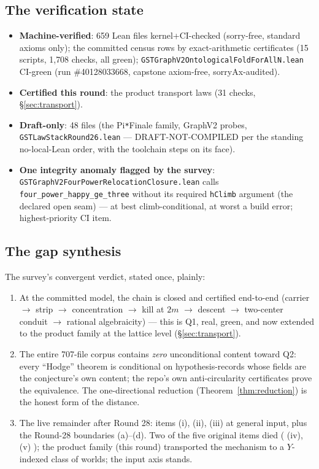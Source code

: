 \documentclass[11pt]{article}
\begin{document}
\subsection{The verification state}

\begin{itemize}
\item \textbf{Machine-verified}: 659 Lean files kernel+CI-checked
(sorry-free, standard axioms only); the committed census rows by
exact-arithmetic certificates (15 scripts, 1{,}708 checks, all green);
\texttt{GSTGraphV2OntologicalFoldForAllN.lean} CI-green
(run \#40128033668, capstone axiom-free, sorryAx-audited).
\item \textbf{Certified this round}: the product transport laws
(31 checks, \S\ref{sec:transport}).
\item \textbf{Draft-only}: 48 files (the Pi\texttt{*}Finale family,
GraphV2 probes, \texttt{GSTLawStackRound26.lean} ---
DRAFT-NOT-COMPILED per the standing no-local-Lean order, with the
toolchain steps on its face).
\item \textbf{One integrity anomaly flagged by the survey}:
\texttt{GSTGraphV2FourPowerRelocationClosure.lean} calls
\texttt{four\_power\_happy\_ge\_three} without its required
\texttt{hClimb} argument (the declared open seam) --- at best
climb-conditional, at worst a build error; highest-priority CI item.
\end{itemize}

\subsection{The gap synthesis}

The survey's convergent verdict, stated once, plainly:

\begin{enumerate}
\item At the committed model, the chain is closed and certified
end-to-end (carrier $\to$ strip $\to$ concentration $\to$ kill at $2m$
$\to$ descent $\to$ two-center conduit $\to$ rational algebraicity) ---
this is Q1, real, green, and now extended to the product family at the
lattice level (\S\ref{sec:transport}).
\item The entire 707-file corpus contains \emph{zero} unconditional
content toward Q2: every ``Hodge'' theorem is conditional on
hypothesis-records whose fields are the conjecture's own content; the
repo's own anti-circularity certificates prove the equivalence. The
one-directional reduction (Theorem~\ref{thm:reduction}) is the honest
form of the distance.
\item The live remainder after Round 28: items (i), (ii), (iii) at
general input, plus the Round-28 boundaries (a)--(d). Two of the five
original items died ( (iv), (v) ); the product family (this round)
transported the mechanism to a $Y$-indexed class of worlds; the input
axis stands.
\end{enumerate}
\end{document}
